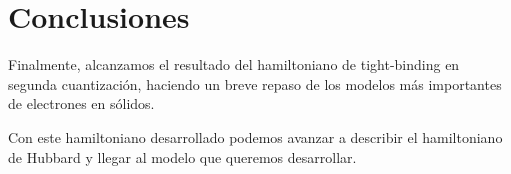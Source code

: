 \documentclass{article} %
\begin{document}
\section{Conclusiones}

Finalmente, alcanzamos el resultado del hamiltoniano de tight-binding en segunda cuantización, haciendo un breve repaso de los modelos más importantes de electrones en sólidos.

Con este hamiltoniano desarrollado podemos avanzar a describir el hamiltoniano de Hubbard y llegar al modelo que queremos desarrollar.

\printbibliography
\end{document}
